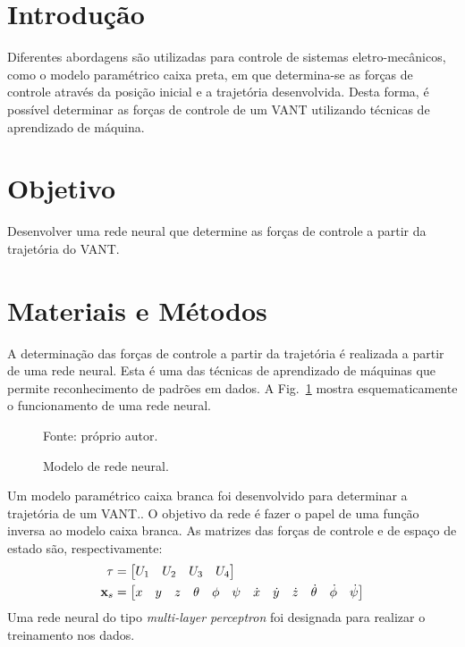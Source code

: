 \section{Introdução}

Diferentes abordagens são utilizadas para controle de sistemas eletro-mecânicos, como o modelo paramétrico caixa preta, em que determina-se as forças de controle através da posição inicial e a trajetória desenvolvida.
Desta forma, é possível determinar as forças de controle de um VANT utilizando técnicas de aprendizado de máquina.

\section{Objetivo}

Desenvolver uma rede neural que determine as forças de controle a partir da trajetória do VANT.

\section{Materiais e Métodos}

A determinação das forças de controle a partir da trajetória é realizada a partir de uma rede neural.
Esta é uma das técnicas de aprendizado de máquinas que permite reconhecimento de padrões em dados. A Fig.~\ref{fig:rede_neural} mostra esquematicamente o funcionamento de uma rede neural.\cite{haykin1999}
%
\begin{figure}[H]
    \centering
    \caption{Modelo de rede neural.}
    

    {\footnotesize Fonte: próprio autor.}
    \label{fig:rede_neural}
\end{figure}
%
Um modelo paramétrico caixa branca foi desenvolvido para determinar a trajetória de um VANT.\cite{geronel2023}.
O objetivo da rede é fazer o papel de uma função inversa ao modelo caixa branca. 
As matrizes das forças de controle e de espaço de estado são, respectivamente:
%
\begin{align}
    \tau &= \begin{bmatrix}
        U_1 & U_2 & U_3 & U_4 
    \end{bmatrix} \\ 
    \setcounter{MaxMatrixCols}{20}
    \mathbf{x}_s &= \begin{bmatrix}
        x & y & z & \theta & \phi & \psi & \dot{x} & \dot{y} & \dot{z} & \dot{\theta} & \dot{\phi} & \dot{\psi}
    \end{bmatrix}
\end{align}
%
Uma rede neural do tipo \emph{multi-layer perceptron} foi designada para realizar o treinamento nos dados.

